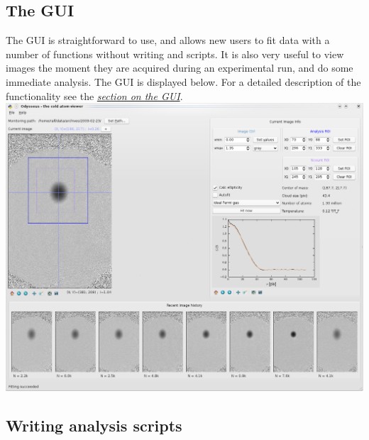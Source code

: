\documentclass[letterpaper,10pt,english]{manual}
\begin{document}
\subsection{The GUI}

The GUI is straightforward to use, and allows new users to fit data with a number of functions without writing and scripts. It is also very useful to view images the moment they are acquired during an experimental run, and do some immediate analysis. The GUI is displayed below. For a detailed description of the functionality see the \hyperlink{section-gui}{\emph{section on the GUI}}.
\includegraphics[width=500pt]{odysseusgui.png}

\subsection{Writing analysis scripts}
\end{document}

